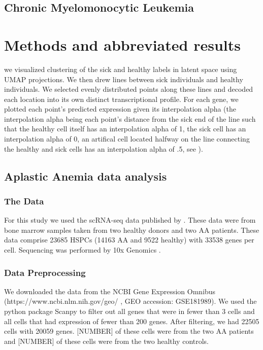 \documentclass{article}
\begin{document}
\subsection{Chronic Myelomonocytic Leukemia}
\citet{ferrall-fairbanks_progenitor_2022} 

\section{Methods and abbreviated results}

we visualized clustering of the sick and healthy labels in latent space using UMAP projections.
We then drew lines between sick individuals and healthy individuals.
We selected evenly distributed points along these lines and decoded each location into its own distinct transcriptional profile.
For each gene, we plotted each point's predicted expression given its interpolation alpha (the interpolation alpha being each point's distance from the sick end of the line such that the healthy cell itself has an interpolation alpha of 1, the sick cell has an interpolation alpha of 0, an artifical cell located halfway on the line connecting the healthy and sick cells has an interpolation alpha of .5, see ).


\subsection{Aplastic Anemia data analysis}

\subsubsection{The Data}
For this study we used the scRNA-seq data published by \citet{tonglin_single-cell_2022}.
These data were from bone marrow samples taken from two healthy donors and two AA patients.
These data comprise 23685 HSPCs (14163 AA and 9522 healthy) with 33538 genes per cell.
Sequencing was performed by 10x Genomics \citep{10X_genomics}.

\subsubsection{Data Preprocessing}
We downloaded the data from the NCBI Gene Expression Omnibus (https://www.ncbi.nlm.nih.gov/geo/ , GEO accession: GSE181989).
We used the python package Scanpy \citep{wolf_scanpy_2018} to filter out all genes that were in fewer than 3 cells and all cells that had expression of fewer than 200 genes.
After filtering, we had 22505 cells with 20059 genes.
[NUMBER] of these cells were from the two AA patients and [NUMBER] of these cells were from the two healthy controls.
\end{document}
